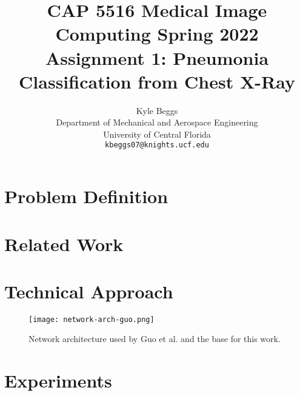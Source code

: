 \documentclass[10pt,twocolumn,letterpaper]{article}
\begin{document}
\title{CAP 5516 Medical Image Computing Spring 2022 Assignment 1: Pneumonia Classification from Chest X-Ray}

\author{Kyle Beggs\\
Department of Mechanical and Aerospace Engineering\\ 
University of Central Florida\\
{\tt\small kbeggs07@knights.ucf.edu}}

\maketitle
\ificcvfinal\thispagestyle{empty}\fi


\begin{abstract}
    
\end{abstract}


\section{Problem Definition}




\section{Related Work}



\section{Technical Approach}



\begin{figure}[t]
\begin{center}
   \texttt{[image: network-arch-guo.png]}
\end{center}
   \caption{Network architecture used by Guo et al. \cite{guoDeepCenterlineMultitaskFully2019} and the base for this work.}
\label{fig:fig1}
\end{figure}

\section{Experiments}



\end{document}
